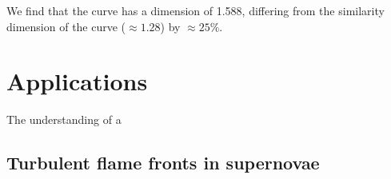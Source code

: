We find that the curve has a dimension of 1.588, differing from the similarity dimension of the curve ($\approx 1.28$) by $\approx 25\%$.

\section{Applications}
The understanding of a 

\subsection{Turbulent flame fronts in supernovae}

\subsection{}























